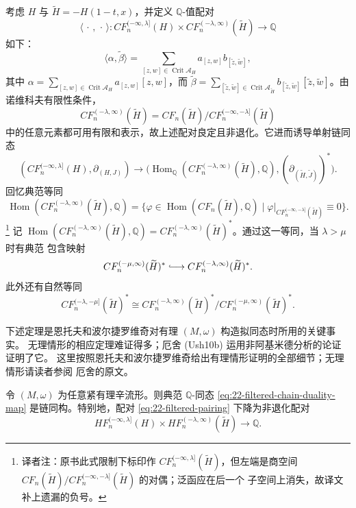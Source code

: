 考虑 $H$ 与 $\widetilde H=-H(1-t,x)$，并定义 $\mathbb Q$-值配对
\begin{equation}
 \langle\,\cdot\,,\,\cdot\,\rangle:
 CF_n^{(-\infty,\lambda]}(H)\times
 CF_n^{(-\lambda,\infty)}(\widetilde H)\longrightarrow\mathbb Q
 \label{eq:22-filtered-pairing}
\end{equation}
如下：
\[
 \langle\alpha,\widetilde\beta\rangle
 =\sum_{[z,w]\in\operatorname{Crit}\mathcal A_H}
 a_{[z,w]}b_{[\widetilde z,\widetilde w]},
\]
其中
$\alpha=\sum_{[z,w]\in\operatorname{Crit}\mathcal A_H}a_{[z,w]}[z,w]$，而
$\widetilde\beta=
\sum_{[\widetilde z,\widetilde w]\in\operatorname{Crit}\mathcal A_{\widetilde H}}
b_{[\widetilde z,\widetilde w]}[\widetilde z,\widetilde w]$。由诺维科夫有限性条件，
\[
 CF_n^{(-\lambda,\infty)}(\widetilde H)
 =CF_n(\widetilde H)/CF_n^{(-\infty,-\lambda]}(\widetilde H)
\]
中的任意元素都可用有限和表示，故上述配对良定且非退化。它进而诱导单射链同态
\begin{equation}
 (CF_n^{(-\infty,\lambda]}(H),\partial_{(H,J)})
 \longrightarrow
 \bigl(\operatorname{Hom}_{\mathbb Q}(CF_n^{(-\lambda,\infty)}(\widetilde H),
 \mathbb Q),(\partial_{(\widetilde H,\widetilde J)})^*\bigr).
 \label{eq:22-filtered-chain-duality-map}
\end{equation}
回忆典范等同
\[
 \operatorname{Hom}(CF_n^{(-\lambda,\infty)}(\widetilde H),\mathbb Q)
 =\{\varphi\in\operatorname{Hom}(CF_n(\widetilde H),\mathbb Q)
 \mid \varphi|_{CF_n^{(-\infty,-\lambda]}(\widetilde H)}\equiv0\}.
\]
\footnote{译者注：原书此式限制下标印作
$CF_n^{(-\infty,\lambda]}(\widetilde H)$，但左端是商空间
$CF_n(\widetilde H)/CF_n^{(-\infty,-\lambda]}(\widetilde H)$ 的对偶；泛函应在后一个
子空间上消失，故译文补上遗漏的负号。}
记
$\operatorname{Hom}(CF_n^{(-\lambda,\infty)}(\widetilde H),\mathbb Q)
=CF_n^{(-\lambda,\infty)}(\widetilde H)^*$。通过这一等同，当 $\lambda>\mu$ 时有典范
包含映射
\[
 CF_n^{(-\mu,\infty)}(\widetilde H)^*\lhook\joinrel\longrightarrow
 CF_n^{(-\lambda,\infty)}(\widetilde H)^*.
\]
此外还有自然等同
\[
 CF_n^{(-\lambda,-\mu]}(\widetilde H)^*
 \cong CF_n^{(-\lambda,\infty)}(\widetilde H)^*/
 CF_n^{(-\mu,\infty)}(\widetilde H)^*.
\]

下述定理是恩托夫和波尔捷罗维奇对有理 $(M,\omega)$ 构造拟同态时所用的关键事实。
无理情形的相应定理难证得多；厄舍 (Ush10b) 运用非阿基米德分析的论证证明了它。
这里按照恩托夫和波尔捷罗维奇给出有理情形证明的全部细节；无理情形请读者参阅
厄舍的原文。

\begin{theorem}
\label{thm:22-rational-filtered-duality}
令 $(M,\omega)$ 为任意紧有理辛流形。则典范 $\mathbb Q$-同态
\eqref{eq:22-filtered-chain-duality-map} 是链同构。特别地，配对
\eqref{eq:22-filtered-pairing} 下降为非退化配对
\begin{equation}
 HF_n^{(-\infty,\lambda]}(H)\times
 HF_n^{(-\lambda,\infty)}(\widetilde H)\longrightarrow\mathbb Q.
 \label{eq:22-filtered-homology-pairing}
\end{equation}
\end{theorem}

